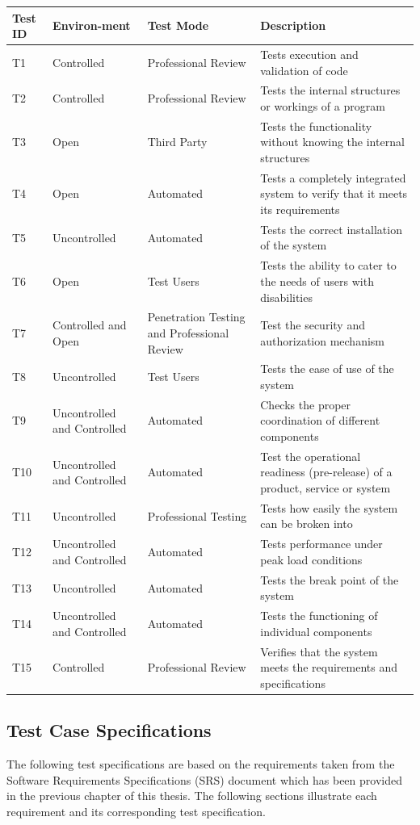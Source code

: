 \documentclass[a4paper,twoside,phd]{BYUPhys}
\begin{document}
{
\begin{longtable}{ |p{2cm}|p{2cm}|p{2cm}|p{5cm}|  }
\hline
\bf{Test ID} & \bf{Environ-ment} & \bf{Test Mode} & \bf{Description}\\
\hline
T1 & Controlled  & Professional Review  &  Tests execution and validation of code \\
T2 & Controlled  & Professional Review  &  Tests the internal structures or workings of a program \\
T3 & Open  & Third Party  &  Tests the functionality without knowing the internal structures \\
T4 & Open  & Automated  &  Tests a completely integrated system to verify that it meets its requirements \\
T5 & Uncontrolled  & Automated  &  Tests the correct installation of the system \\
T6 & Open  & Test Users  &  Tests the ability to cater to the needs of users with disabilities \\
T7 & Controlled and Open  & Penetration Testing and Professional Review  &  Test the security and authorization mechanism \\
T8 & Uncontrolled  & Test Users  &  Tests the ease of use of the system \\
T9 & Uncontrolled and Controlled  & Automated  &  Checks the proper coordination of different components \\
T10 & Uncontrolled and Controlled  & Automated &  Test the operational readiness (pre-release) of a product, service or system \\
T11 & Uncontrolled  & Professional Testing  &  Tests how easily the system can be broken into \\
T12 & Uncontrolled and Controlled  & Automated  &  Tests performance under peak load conditions \\
T13 & Uncontrolled  & Automated  &  Tests the break point of the system \\
T14 & Uncontrolled and Controlled  & Automated  &  Tests the functioning of individual components \\
T15 & Controlled  & Professional Review  &  Verifies that the system meets the requirements and specifications \\
\hline
\end{longtable}
}
\subsection{Test Case Specifications}
The following test specifications are based on the requirements taken from the Software Requirements Specifications (SRS) document which has been provided in the previous chapter of this thesis. The following sections illustrate each requirement and its corresponding test specification. 
\end{document}
